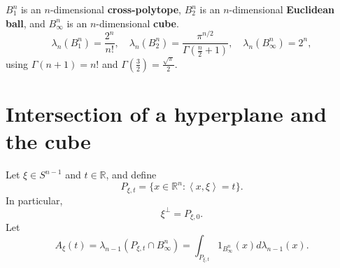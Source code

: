 \documentclass{article}
\newcommand{\inner}[2]{\left\langle #1, #2 \right\rangle}
\theoremstyle{definition}
\begin{document}
$B_1^n$ is an $n$-dimensional \textbf{cross-polytope},
$B_2^n$ is an $n$-dimensional \textbf{Euclidean ball},
and $B_\infty^n$ is an $n$-dimensional \textbf{cube}.
\[
\lambda_n(B_1^n) =\frac{2^n}{n!},
\quad \lambda_n(B_2^n) = \frac{\pi^{n/2}}{\Gamma(\frac{n}{2}+1)},
\quad \lambda_n(B_\infty^n) = 2^n,
\]
using $\Gamma(n+1)=n!$ and $\Gamma(\frac{3}{2})=\frac{\sqrt{\pi}}{2}$.



\section{Intersection of a hyperplane and the cube}
Let $\xi \in S^{n-1}$ and $t \in \mathbb{R}$,  and define
\[
P_{\xi,t} = \{x \in \mathbb{R}^n: \inner{x}{\xi}=t\}.
\]
In particular,
\[
\xi^\perp = P_{\xi,0}.
\]
Let 
\[
A_\xi(t) = \lambda_{n-1}(P_{\xi,t} \cap B_\infty^n) = 
\int_{P_{\xi,t}} 1_{B_\infty^n}(x) d\lambda_{n-1}(x).
\]
\end{document}

